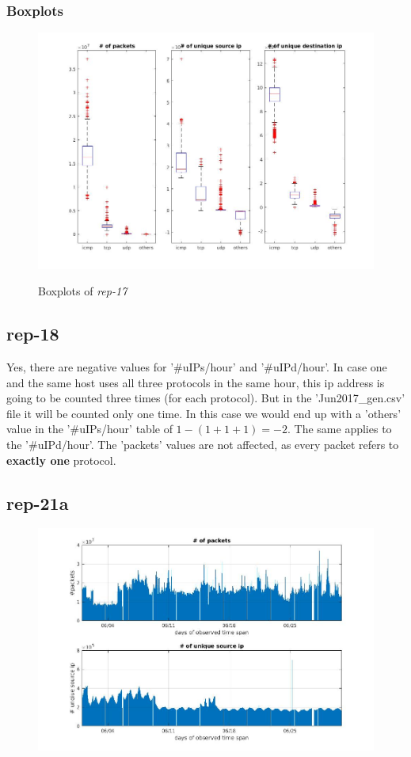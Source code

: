 \subsubsection*{Boxplots}
\begin{figure}[H]
\center
\includegraphics[width=.7\textwidth]{./chapters/plots/rep17.jpg}\\
\caption{Boxplots of \textit{rep-17}}
\end{figure}


\subsection*{rep-18}
Yes, there are negative values for '\#uIPs/hour' and '\#uIPd/hour'. In case one and the same host uses all three protocols in the same hour, this ip address is going to be counted three times (for each protocol). But in the 'Jun2017\_gen.csv' file it will be counted only one time. In this case we would end up with a 'others' value in the '\#uIPs/hour' table of $1 - (1+1+1) = -2$. The same applies to the '\#uIPd/hour'. The 'packets' values are not affected, as every packet refers to \textbf{exactly one} protocol.

\subsection*{rep-21a}
\begin{figure}[H]
\center
\includegraphics[width=.7\textwidth]{./chapters/plots/rep21a.jpg}\\
\caption{}
\end{figure}

